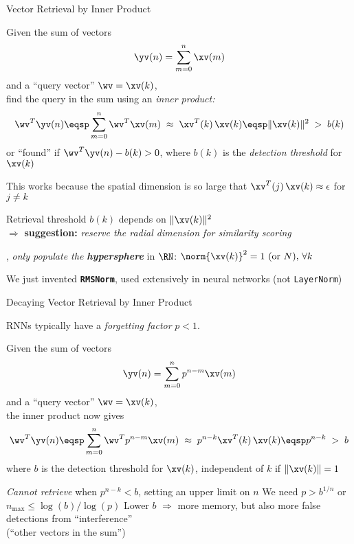 \begin{slide}[\slideopts,toc={Inner Product}]{Vector Retrieval by Inner Product}

  Given the sum of vectors
  \[
  \yv(n) = \sum_{m=0}^n \xv(m)
  \]
  and a ``query vector'' $\wv = \xv(k)$,\\
  \maybepause
  find the query in the sum using an \emph{inner product:}
  \[
  \wv^T\yv(n) \eqsp \sum_{m=0}^n \wv^T\xv(m) \;\approx\; \xv^T(k)\,\xv(k) \eqsp \|\xv(k)\|^2 \;>\; b(k)
  \]
  or ``found'' if $\wv^T\yv(n) - b(k) > 0$, where $b(k)$ is the \emph{detection threshold} for $\xv(k)$

  \begin{itemize}
  \mpitem This works because the spatial dimension is so large that $\xv^T(j)\,\xv(k)\approx \epsilon$ for $j\ne k$

  \mpitem Retrieval threshold $b(k)$ depends on $\|\xv(k)\|^2$\\
  $\Rightarrow$ \textbf{suggestion:} \emph{reserve the radial dimension for similarity scoring}

  \mpitem \Ie, \emph{only populate the \textbf{hypersphere}} in $\RN$: $\norm{\xv(k)}^2 = 1 \mbox{ (or $N$)}, \, \forall k$

  \mpitem We just invented \textbf{\texttt{RMSNorm}}, used extensively in neural networks (not \texttt{LayerNorm})

  \end{itemize}

\end{slide}

\begin{slide}[\slideopts,toc={}]{Decaying Vector Retrieval by Inner Product}

  RNNs typically have a \emph{forgetting factor} $p<1$.

  Given the sum of vectors
  \[
  \yv(n) = \sum_{m=0}^n p^{n-m}\xv(m)
  \]
  and a ``query vector'' $\wv = \xv(k)$,\\
  \maybepause
  the inner product now gives
  \[
  \wv^T\yv(n) \eqsp \sum_{m=0}^n \wv^Tp^{n-m}\xv(m) \;\approx\; p^{n-k}\xv^T(k)\,\xv(k) \eqsp p^{n-k} \;>\; b
  \]
  where $b$ is the detection threshold for $\xv(k)$, independent of $k$ if $\|\xv(k)\|=1$

  \begin{itemize}
  \mpitem \emph{Cannot retrieve} when $p^{n-k} < b$, setting an upper limit on $n$
  \mpitem We need $p > b^{1/n}$ or $n_{\mbox{max}} \le \log(b)/\log(p)$
  \mpitem Lower $b$ $\Rightarrow$ more memory, but also more false detections from ``interference''\\
	  (``other vectors in the sum'')
  \end{itemize}

\end{slide}

